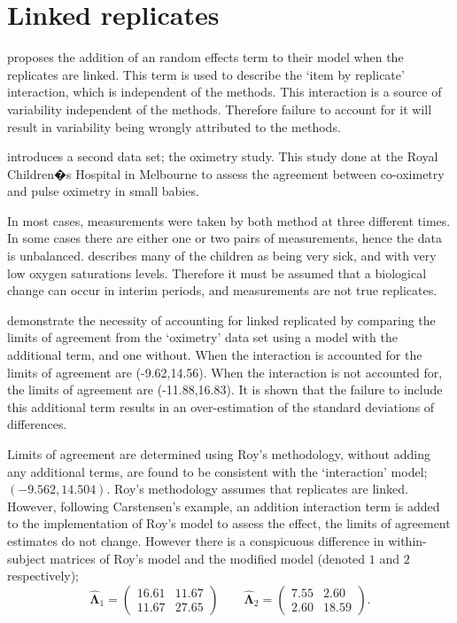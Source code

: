 \documentclass[12pt, a4paper]{report}
\theoremstyle{plain}
\theoremstyle{definition}
\theoremstyle{remark}
\begin{document}
	
	
	\section{Linked replicates}
	
	\citet{BXC2008} proposes the addition of an random effects term to their model when the replicates are linked. This term is used to describe the `item by replicate' interaction, which is independent of the methods. This interaction is a source of variability independent of the methods. Therefore failure to account for it will result in variability being wrongly attributed to the methods.
	
	\citet{BXC2008} introduces a second data set; the oximetry study. This study done at the Royal Children�s Hospital in
	Melbourne to assess the agreement between co-oximetry and pulse oximetry in small babies.
	
	In most cases, measurements were taken by both method at three different times. In some cases there are either one or two pairs of measurements, hence the data is unbalanced. \citet{BXC2008} describes many of the children as being very sick, and with very low oxygen saturations levels. Therefore it must be assumed that a biological change can occur in interim periods, and measurements are not true replicates.
	
	\citet{BXC2008} demonstrate the necessity of accounting for linked replicated by comparing the limits of agreement from the `oximetry' data set using a model with the additional term, and one without. When the interaction is accounted for the limits of agreement are (-9.62,14.56). When the interaction is not accounted for, the limits of agreement are (-11.88,16.83). It is shown that the failure to include this additional term results in an over-estimation of the standard deviations of differences.
	
	Limits of agreement are determined using Roy's methodology, without adding any additional terms, are found to be consistent with the `interaction' model; $(-9.562, 14.504 )$. Roy's methodology assumes that replicates are linked. However, following Carstensen's example, an addition interaction term is added to the implementation of Roy's model to assess the effect, the limits of agreement estimates do not change. However there is a conspicuous difference in within-subject matrices of Roy's model and the modified model (denoted $1$ and $2$ respectively);
	\begin{equation}
	\hat{\boldsymbol{\Lambda}}_{1}= \left(\begin{array}{cc}
	16.61 &	11.67\\
	11.67 & 27.65 \end{array}\right) \qquad
	\boldsymbol{\hat{\Lambda}}_{2}= \left( \begin{array}{cc}
	7.55 & 2.60 \\
	2.60 & 18.59 \end{array} \right). 
	\end{equation}
	
\end{document}
